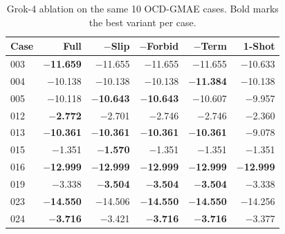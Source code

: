 \begin{table}[t]
\centering
\small
\caption{Grok-4 ablation on the same 10 OCD-GMAE cases. Bold marks the best variant per case.}
\label{tab:ocd-ablation-grok4}
\begin{tabular}{lrrrrr}
\toprule
Case & Full & $-$Slip & $-$Forbid & $-$Term & 1-Shot \\
\midrule
003 & \textbf{$-$11.659} & $-$11.655 & $-$11.655 & $-$11.655 & $-$10.633 \\
004 & $-$10.138 & $-$10.138 & $-$10.138 & \textbf{$-$11.384} & $-$10.138 \\
005 & $-$10.118 & \textbf{$-$10.643} & \textbf{$-$10.643} & $-$10.607 & $-$9.957 \\
012 & \textbf{$-$2.772} & $-$2.701 & $-$2.746 & $-$2.746 & $-$2.360 \\
013 & \textbf{$-$10.361} & \textbf{$-$10.361} & \textbf{$-$10.361} & \textbf{$-$10.361} & $-$9.078 \\
015 & $-$1.351 & \textbf{$-$1.570} & $-$1.351 & $-$1.351 & $-$1.351 \\
016 & \textbf{$-$12.999} & \textbf{$-$12.999} & \textbf{$-$12.999} & \textbf{$-$12.999} & \textbf{$-$12.999} \\
019 & $-$3.338 & \textbf{$-$3.504} & \textbf{$-$3.504} & \textbf{$-$3.504} & $-$3.338 \\
023 & \textbf{$-$14.550} & $-$14.506 & \textbf{$-$14.550} & \textbf{$-$14.550} & $-$14.256 \\
024 & \textbf{$-$3.716} & $-$3.421 & \textbf{$-$3.716} & \textbf{$-$3.716} & $-$3.377 \\
\bottomrule
\end{tabular}
\end{table}

